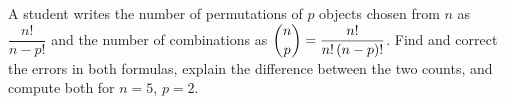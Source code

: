 A student writes the number of permutations of $p$ objects chosen from $n$ as $\dfrac{n!}{n-p!}$ and the number of combinations as $\dbinom np=\dfrac{n!}{n!\,(n-p)!}$. Find and correct the errors in both formulas, explain the difference between the two counts, and compute both for $n=5$, $p=2$.
